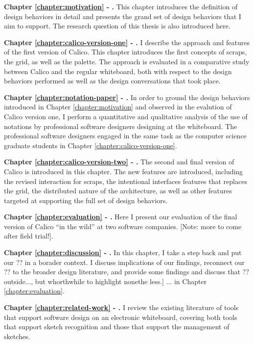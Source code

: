 \textbf{Chapter \ref{chapter:motivation} - .} This chapter introduces the definition of design behaviors in detail and presents the grand set of design behaviors that I aim to support. The research question of this thesis is also introduced here.

\textbf{Chapter \ref{chapter:calico-version-one} - .} I describe the approach and features of the first version of Calico. This chapter introduces the first concepts of scraps, the grid, as well as the palette. The approach is evaluated in a comparative study between Calico and the regular whiteboard, both with respect to the design behaviors performed as well as the design conversations that took place.

\textbf{Chapter \ref{chapter:notation-paper} - .} In order to ground the design behaviors introduced in Chapter \ref{chapter:motivation} and observed in the evalution of Calico version one, I perform a quantitative and qualitative analysis of the use of notations by professional software designers designing at the whiteboard. The professional software designers engaged in the same task as the computer science graduate students in Chapter \ref{chapter:calico-version-one}.

\textbf{Chapter \ref{chapter:calico-version-two} - .} The second and final version of Calico is introduced in this chapter. The new features are introduced, including the revised interaction for scraps, the intentional interfaces features that replaces the grid, the distributed nature of the architecture, as well as other features targeted at supporting the full set of design behaviors.

\textbf{Chapter \ref{chapter:evaluation} - .} Here I present our evaluation of the final version of Calico ``in the wild'' at two software companies. [Note: more to come after field trial!].

\textbf{Chapter \ref{chapter:discussion} - .} In this chapter, I take a step back and put our ?? in a borader context. I discuss implications of our findings, reconnect our ?? to the broader design literature, and provide some findings and discuss that ?? outside..., but whorthwhile to highlight nonethe less.] ... in Chapter \ref{chapter:evaluation}. 

\textbf{Chapter \ref{chapter:related-work} - .} I review the existing literature of tools that support software design on an electronic whiteboard, covering both tools that support sketch recognition and those that support the management of sketches.

